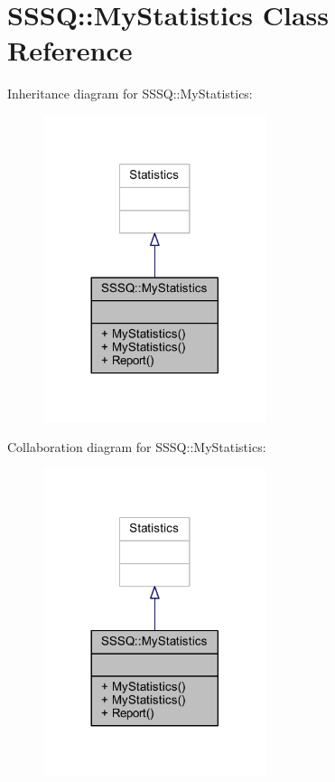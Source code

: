 \hypertarget{class_s_s_s_q_1_1_my_statistics}{}\section{S\+S\+SQ\+:\+:My\+Statistics Class Reference}
\label{class_s_s_s_q_1_1_my_statistics}


Inheritance diagram for S\+S\+SQ\+:\+:My\+Statistics\+:
\nopagebreak
\begin{figure}[H]
\begin{center}
\leavevmode
\includegraphics[width=185pt]{class_s_s_s_q_1_1_my_statistics__inherit__graph}
\end{center}
\end{figure}


Collaboration diagram for S\+S\+SQ\+:\+:My\+Statistics\+:
\nopagebreak
\begin{figure}[H]
\begin{center}
\leavevmode
\includegraphics[width=185pt]{class_s_s_s_q_1_1_my_statistics__coll__graph}
\end{center}
\end{figure}
